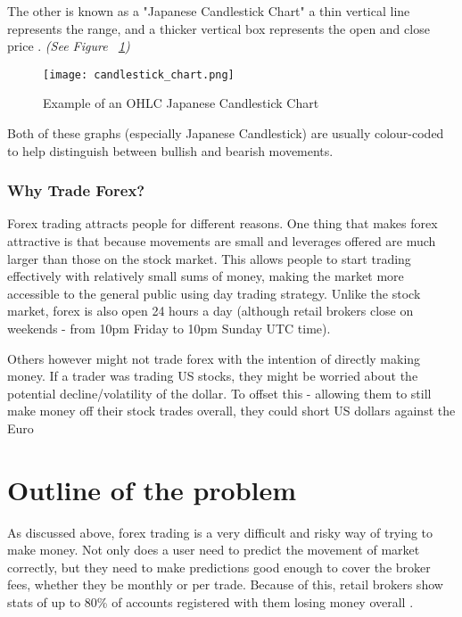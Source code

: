             The other is known as a "Japanese Candlestick Chart" a thin vertical line represents the range, and a thicker vertical box represents the open and close price \cite{candlestick_OHLC}. \textit{(See Figure ~\ref{fig:candlestick_ex})} 

            \begin{figure}[htbp]
                \centering
                \texttt{[image: candlestick\_chart.png]}
                \caption{Example of an OHLC Japanese Candlestick Chart \cite{candlestick_OHLC}}
                \label{fig:candlestick_ex}
            \end{figure}

            Both of these graphs (especially Japanese Candlestick) are usually colour-coded to help distinguish between bullish and bearish movements.
        


            \subsubsection{Why Trade Forex?}
            Forex trading attracts people for different reasons. One thing that makes forex attractive is that because movements are small and leverages offered are much larger than those on the stock market. This allows people to start trading effectively with relatively small sums of money, making the market more accessible to the general public using day trading strategy. Unlike the stock market, forex is also open 24 hours a day (although retail brokers close on weekends - from 10pm Friday to 10pm Sunday UTC time).

            Others however might not trade forex with the intention of directly making money. If a trader was trading US stocks, they might be worried about the potential decline/volatility of the dollar. To offset this - allowing them to still make money off their stock trades overall, they could short US dollars against the Euro \cite{investopedia_beginner}


    \section{Outline of the problem}
    As discussed above, forex trading is a very difficult and risky way of trying to make money. Not only does a user need to predict the movement of market correctly, but they need to make predictions good enough to cover the broker fees, whether they be monthly or per trade. Because of this, retail brokers show stats of up to 80\% of accounts registered with them losing money overall \cite{hatzakis_2019}.

